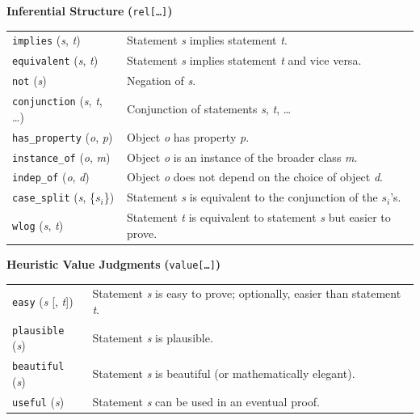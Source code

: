 \documentclass[smallextended,oneside]{svjour3}       %
\begin{document}
\begin{table}[ht]
\begin{mdframed}
{\centering
\textbf{Inferential Structure}  \textbf{(}\texttt{rel[\ldots]}\textbf{)}

\par}

\smallskip

\noindent
\begin{tabular}{@{\hspace{-.25ex}}p{}p{}}
\texttt{implies} (\emph{s}, \emph{t}) & Statement \emph{s} implies statement \emph{t}.\\
\texttt{equivalent} (\emph{s}, \emph{t}) & Statement \emph{s} implies statement \emph{t} and vice versa.\\
\texttt{not} (\emph{s}) & Negation of \emph{s}.\\
\texttt{conjunction} (\emph{s}, \emph{t}, \ldots) & Conjunction of statements \emph{s}, \emph{t}, \ldots \\
\texttt{has\_property} (\emph{o}, \emph{p}) & Object \emph{o} has property \emph{p}.\\
\texttt{instance\_of} (\emph{o}, \emph{m}) & Object \emph{o} is an instance of the broader class \emph{m}.\\
\texttt{indep\_of} (\emph{o}, \emph{d}) & Object \emph{o} does not depend on the choice of object \emph{d}.\\
\texttt{case\_split} (\emph{s}, \{$s_i$\}) & Statement \emph{s} is equivalent to the conjunction of the $s_i$'s.\\
\texttt{wlog} (\emph{s}, \emph{t}) & Statement \emph{t} is equivalent to statement \emph{s} but easier to prove.\\
\end{tabular}

\medskip

{\centering
\textbf{Heuristic Value Judgments} \textbf{(}\texttt{value[\ldots]}\textbf{)}

\par}

\smallskip

\noindent
\begin{tabular}{@{\hspace{-.25ex}}p{}p{}}
\texttt{easy} (\emph{s} [, \emph{t}]) & Statement \emph{s} is easy to prove; optionally, easier than statement \emph{t}.\\
\texttt{plausible} (\emph{s}) & Statement \emph{s} is plausible.\\
\texttt{beautiful} (\emph{s}) & Statement \emph{s} is beautiful (or mathematically elegant).\\
\texttt{useful} (\emph{s}) & Statement \emph{s} can be used in an eventual proof.\\
\end{tabular}


\end{mdframed}
\end{table}
\end{document}
